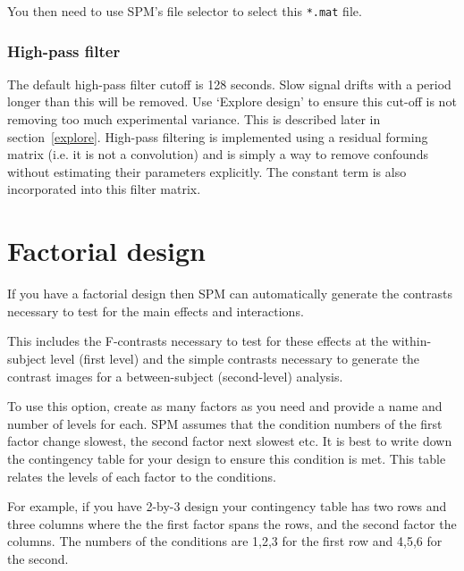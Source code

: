 You then need to use SPM's file selector to select this
\verb!*.mat! file.

\subsubsection{High-pass filter}
The default high-pass filter cutoff is 128 seconds. Slow signal drifts with a period longer than this will be removed. Use `Explore design' to ensure this cut-off is not removing too much experimental variance. 
This is described later in section~\ref{explore}. High-pass filtering is implemented using a residual forming matrix (i.e. it is not a convolution) and is simply a way to remove confounds without estimating their parameters explicitly.  The constant term is also incorporated into this filter matrix.


\section{Factorial design}
If you have a factorial design then SPM can automatically generate the contrasts necessary to test for the main effects and interactions. 

                                                                                                            

This includes the F-contrasts necessary to test for these effects at the within-subject level (first level) and the simple contrasts necessary to generate the contrast images for a between-subject (second-level) analysis.

                                                                                                            

To use this option, create as many factors as you need and provide a name and number of levels for each.  SPM assumes that the condition numbers of the first factor change slowest, the second factor next slowest etc. It is best to write down the contingency table for your design to ensure this condition is met. This table relates the levels of each factor to the conditions. 

                                                                                                            

For example, if you have 2-by-3 design  your contingency table has two rows and three columns where the the first factor spans the rows, and the second factor the columns. The numbers of the conditions are 1,2,3 for the first row and 4,5,6 for the second. 

